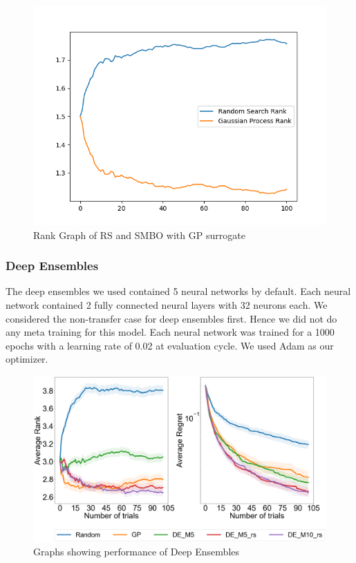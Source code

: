\documentclass[12pt, twoside, ngerman]{report}
\begin{document}
\begin{figure}[htb]
  \centering
    \includegraphics[scale=0.5]{images/RsGpRankGraph}
    \caption{Rank Graph of RS and SMBO with GP surrogate}
    \label{fig:RsGpRankGraph}
\end{figure}

\subsubsection{Deep Ensembles}

The deep ensembles we used contained 5 neural networks by default.  Each neural network contained 2 fully connected neural layers with 32 neurons each. 
We considered the non-transfer case for deep ensembles first.
Hence we did not do any meta training for this model.
Each neural network was trained for a 1000 epochs with a learning rate of 0.02 at evaluation cycle.
We used Adam as our optimizer.

\begin{figure}[h]
  \centering
    \includegraphics[scale=0.25]{images/DEPerformance}
    \caption{Graphs showing performance of Deep Ensembles}
    \label{fig:DEPerformance}
\end{figure}
\end{document}
